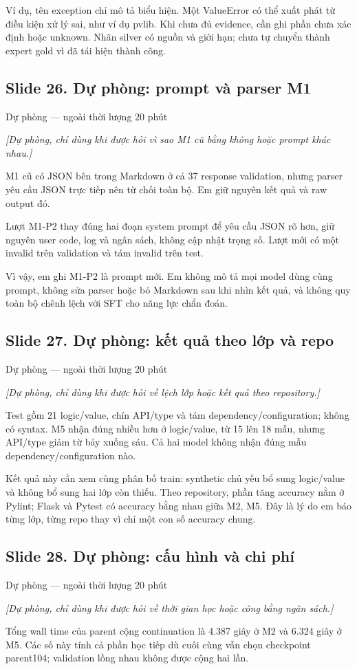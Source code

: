 \documentclass[12pt,a4paper]{article}
\begin{document}
Ví dụ, tên exception chỉ mô tả biểu hiện. Một ValueError có thể xuất phát từ điều kiện xử lý sai, như ví dụ pvlib. Khi chưa đủ evidence, cần ghi phần chưa xác định hoặc unknown. Nhãn silver có nguồn và giới hạn; chưa tự chuyển thành expert gold vì đã tái hiện thành công.

\subsection*{Slide 26. Dự phòng: prompt và parser M1}
{\small\color{gray}Dự phòng — ngoài thời lượng 20 phút}\par
{\itshape\color{gray}[Dự phòng, chỉ dùng khi được hỏi vì sao M1 cũ bằng không hoặc prompt khác nhau.]}\par
M1 cũ có JSON bên trong Markdown ở cả 37 response validation, nhưng parser yêu cầu JSON trực tiếp nên từ chối toàn bộ. Em giữ nguyên kết quả và raw output đó.

Lượt M1-P2 thay đúng hai đoạn system prompt để yêu cầu JSON rõ hơn, giữ nguyên user code, log và ngân sách, không cập nhật trọng số. Lượt mới có một invalid trên validation và tám invalid trên test.

Vì vậy, em ghi M1-P2 là prompt mới. Em không mô tả mọi model dùng cùng prompt, không sửa parser hoặc bỏ Markdown sau khi nhìn kết quả, và không quy toàn bộ chênh lệch với SFT cho năng lực chẩn đoán.

\clearpage
\subsection*{Slide 27. Dự phòng: kết quả theo lớp và repo}
{\small\color{gray}Dự phòng — ngoài thời lượng 20 phút}\par
{\itshape\color{gray}[Dự phòng, chỉ dùng khi được hỏi về lệch lớp hoặc kết quả theo repository.]}\par
Test gồm 21 logic/value, chín API/type và tám dependency/configuration; không có syntax. M5 nhận đúng nhiều hơn ở logic/value, từ 15 lên 18 mẫu, nhưng API/type giảm từ bảy xuống sáu. Cả hai model không nhận đúng mẫu dependency/configuration nào.

Kết quả này cần xem cùng phân bố train: synthetic chủ yếu bổ sung logic/value và không bổ sung hai lớp còn thiếu. Theo repository, phần tăng accuracy nằm ở Pylint; Flask và Pytest có accuracy bằng nhau giữa M2, M5. Đây là lý do em báo từng lớp, từng repo thay vì chỉ một con số accuracy chung.

\subsection*{Slide 28. Dự phòng: cấu hình và chi phí}
{\small\color{gray}Dự phòng — ngoài thời lượng 20 phút}\par
{\itshape\color{gray}[Dự phòng, chỉ dùng khi được hỏi về thời gian học hoặc công bằng ngân sách.]}\par
Tổng wall time của parent cộng continuation là 4.387 giây ở M2 và 6.324 giây ở M5. Các số này tính cả phần học tiếp dù cuối cùng vẫn chọn checkpoint parent104; validation lồng nhau không được cộng hai lần.
\end{document}
